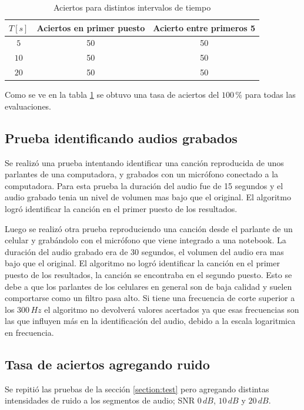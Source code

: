 \documentclass[10pt,spanish,a4paper,openany,notitlepage]{article}
\begin{document}
\begin{table}[H]
\centering
\begin{tabular}{|c|c|c|}
\hline
$T \unit{[s]}$ & Aciertos en primer puesto & Acierto entre primeros 5 \\
\hline
$5$ & 50 & 50\\
\hline
$10$ & 50 & 50\\
\hline
$20$ & 50 & 50\\
\hline
\end{tabular}
\caption{Aciertos para distintos intervalos de tiempo}
\label{table:segmentos}
\end{table}

Como se ve en la tabla \ref{table:segmentos} se obtuvo
una tasa de aciertos del $100\,\unit{\%}$ para todas las evaluaciones.

\subsection{Prueba identificando audios grabados}

Se realizó una prueba intentando identificar una canción reproducida
de unos parlantes de una computadora, y grabados con un micrófono conectado
a la computadora. Para esta prueba la duración del audio fue de 15 segundos
y el audio grabado tenia un nivel de volumen mas bajo que el original.
El algoritmo logró identificar la canción en el primer puesto de los resultados.

Luego se realizó otra prueba reproduciendo una canción desde el parlante
de un celular y grabándolo con el micrófono que viene integrado a una notebook.
La duración del audio grabado era de 30 segundos, el volumen del audio
era mas bajo que el original.
El algoritmo no logró identificar la canción en el primer puesto de los
resultados, la canción se encontraba en el segundo puesto.
Esto se debe a que los parlantes de los celulares en general son de baja
calidad y suelen comportarse como un filtro pasa alto. Si tiene
una frecuencia de corte superior a los $300\,\unit{Hz}$ el algoritmo
no devolverá valores acertados ya que esas frecuencias son las que
influyen más en la identificación del audio, debido a la escala logaritmica
en frecuencia.

\subsection{Tasa de aciertos agregando ruido}

Se repitió las pruebas de la sección \ref{section:test} pero agregando
distintas intensidades de ruido a los segmentos de audio; SNR $0\,\unit{dB}$,
$10\,\unit{dB}$ y $20\,\unit{dB}$.
\end{document}
